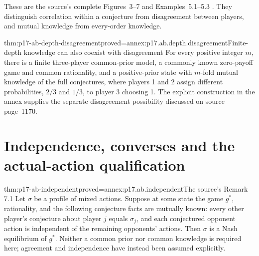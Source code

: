 These are the source's complete Figures~3--7 and Examples~5.1--5.3
\parencite[pp.~1170--1173]{AumannBrandenburger1995Epistemic}.
They distinguish correlation within a conjecture from disagreement
between players, and mutual knowledge from every-order knowledge.

\begin{hbtheorem}{thm:p17-ab-depth-disagreement}{proved=annex:p17.ab.depth.disagreement}{Finite-depth knowledge can also coexist with disagreement}
For every positive integer \(m\), there is a finite three-player
common-prior model, a commonly known zero-payoff game and common
rationality, and a positive-prior state with \(m\)-fold mutual
knowledge of the full conjectures, where players 1 and 2 assign
different probabilities, \(2/3\) and \(1/3\), to player 3 choosing 1.
The explicit construction in the annex supplies the separate
disagreement possibility discussed on source page~1170.
\end{hbtheorem}

\section{Independence, converses and the actual-action qualification}

\begin{hbtheorem}{thm:p17-ab-independent}{proved=annex:p17.ab.independent}{The source's Remark 7.1}
Let \(\sigma\) be a profile of mixed actions. Suppose at some
state the game \(g^*\), rationality, and the following conjecture
facts are mutually known: every other player's conjecture about
player \(j\) equals \(\sigma_j\), and each conjectured opponent
action is independent of the remaining opponents' actions.
Then \(\sigma\) is a Nash equilibrium of \(g^*\).
Neither a common prior nor common knowledge is required here;
agreement and independence have instead been assumed explicitly.
\end{hbtheorem}

